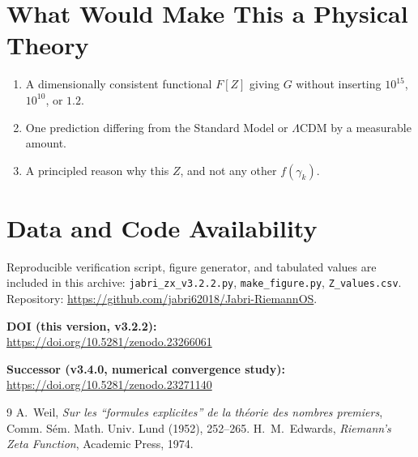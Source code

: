 \documentclass[12pt,a4paper]{article}
\begin{document}
\section{What Would Make This a Physical Theory}
\begin{enumerate}
\item A dimensionally consistent functional $F[Z]$ giving $G$ without
      inserting $10^{15}$, $10^{10}$, or $1.2$.
\item One prediction differing from the Standard Model or $\Lambda$CDM by a
      measurable amount.
\item A principled reason why this $Z$, and not any other $f(\gamma_k)$.
\end{enumerate}

\section{Data and Code Availability}
Reproducible verification script, figure generator, and tabulated values are
included in this archive: \texttt{jabri\_zx\_v3.2.2.py},
\texttt{make\_figure.py}, \texttt{Z\_values.csv}.
Repository: \url{https://github.com/jabri62018/Jabri-RiemannOS}.

\medskip
\noindent
\textbf{DOI (this version, v3.2.2):}\\
\url{https://doi.org/10.5281/zenodo.23266061}

\medskip
\noindent
\textbf{Successor (v3.4.0, numerical convergence study):}\\
\url{https://doi.org/10.5281/zenodo.23271140}

\begin{thebibliography}{9}
 A.~Weil, \emph{Sur les ``formules explicites'' de la
th\'eorie des nombres premiers}, Comm. S\'em. Math. Univ. Lund (1952), 252--265.
 H.~M.~Edwards, \emph{Riemann's Zeta Function},
Academic Press, 1974.
\end{thebibliography}
\end{document}
